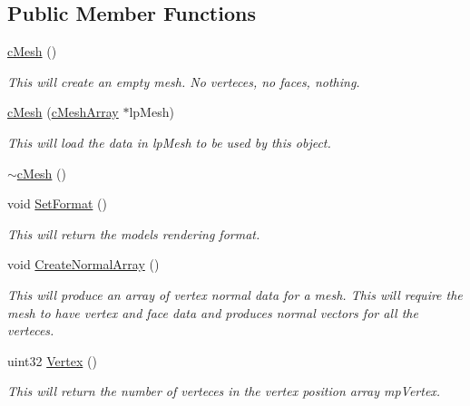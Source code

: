 \subsection*{Public Member Functions}
\begin{DoxyCompactItemize}
\item 
\hyperlink{classc_mesh_a1b689b9d00f34fe7e4cbf8910bb310f9}{cMesh} ()
\begin{DoxyCompactList}\small\item\em This will create an empty mesh. No verteces, no faces, nothing. \item\end{DoxyCompactList}\item 
\hyperlink{classc_mesh_ae24161941f8538d55caa144d76b535bc}{cMesh} (\hyperlink{classc_mesh_array}{cMeshArray} $\ast$lpMesh)
\begin{DoxyCompactList}\small\item\em This will load the data in lpMesh to be used by this object. \item\end{DoxyCompactList}\item 
\hyperlink{classc_mesh_a3148f48c2bb9a7d5c2626f03bfa1586f}{$\sim$cMesh} ()
\item 
void \hyperlink{classc_mesh_a8dd2a8840d8e2c6aaefa95884a2f9f68}{SetFormat} ()
\begin{DoxyCompactList}\small\item\em This will return the models rendering format. \item\end{DoxyCompactList}\item 
void \hyperlink{classc_mesh_a5f35c2b9245d765b7958f91379d63e7d}{CreateNormalArray} ()
\begin{DoxyCompactList}\small\item\em This will produce an array of vertex normal data for a mesh. This will require the mesh to have vertex and face data and produces normal vectors for all the verteces. \item\end{DoxyCompactList}\item 
uint32 \hyperlink{classc_mesh_a1a58ae1ab68b816b36188ac769ac50fd}{Vertex} ()
\begin{DoxyCompactList}\small\item\em This will return the number of verteces in the vertex position array mpVertex. \item\end{DoxyCompactList}\item 

\end{DoxyCompactItemize}
